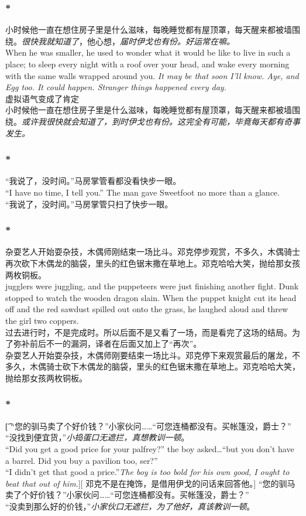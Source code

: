 \documentclass[12pt,a4paper]{article}
\newcommand{\h}[1]{{\color{red}#1}\\}
\newcommand{\la}[1]{{\color{blue}#1}\\}
\begin{document}
\subsubsection{\color{red}*}\la{
	小时候他一直在想住房子里是什么滋味，每晚睡觉都有屋顶罩，每天醒来都被墙围绕。\emph{很快我就知道了}，他心想，\emph{届时伊戈也有份。好运常在嘛。}\\
	When he was smaller, he used to wonder what it would be like to live in such a place; to sleep every night with a roof over your head, and wake every morning with the same walls wrapped around you. \emph{It may be that soon I'll know. Aye, and Egg too. It could happen. Stranger things happened every day.}}\h{
	虚拟语气变成了肯定}
	小时候他一直在想住房子里是什么滋味，每晚睡觉都有屋顶罩，每天醒来都被墙围绕。\emph{或许我很快就会知道了，到时伊戈也有份。这完全有可能，毕竟每天都有奇事发生。}
	
\subsubsection{\color{red}*}\la{	
	“我说了，没时间。”马房掌管看都没看快步一眼。\\
	“I have no time, I tell you.” The man gave Sweetfoot no more than a glance. }
	“我说了，没时间。”马房掌管只扫了快步一眼。
	
\subsubsection{\color{red}*}\la{
	杂耍艺人开始耍杂技，木偶师刚结束一场比斗。邓克停步观赏，不多久，木偶骑士再次砍下木偶龙的脑袋，里头的红色锯末撒在草地上。邓克哈哈大笑，抛给那女孩两枚铜板。 \\
	jugglers were juggling, and the puppeteers were just finishing another fight. Dunk stopped to watch the wooden dragon slain. When the puppet knight cut its head off and the red sawdust spilled out onto the grass, he laughed aloud and threw the girl two coppers. }\h{
	过去进行时，不是完成时。所以后面不是又看了一场，而是看完了这场的结局。为了弥补前后不一的漏洞，译者在后面又加上了“再次”。}
	杂耍艺人开始耍杂技，木偶师刚要结束一场比斗。邓克停下来观赏最后的屠龙，不多久，木偶骑士砍下木偶龙的脑袋，里头的红色锯末撒在草地上。邓克哈哈大笑，抛给那女孩两枚铜板。

\subsubsection{\color{red}*}\t[
	“您的驯马卖了个好价钱？”小家伙问……“可您连桶都没有。买帐篷没，爵士？”\\
	“没找到便宜货，”\emph{小捣蛋口无遮拦，真想教训一顿}。\\
	“Did you get a good price for your palfrey?” the boy asked\ldots “but you don't have a barrel. Did you buy a pavilion too, ser?”\\
	“I didn't get that good a price.”\emph{The boy is too bold for his own good, I ought to beat that out of him.}][
	邓克不是在掩饰，是借用伊戈的问话来回答他。]
	“您的驯马卖了个好价钱？”小家伙问……“可您连桶都没有。买帐篷没，爵士？”\\
	“没卖到那么好的价钱，”\emph{小家伙口无遮拦，为了他好，真该教训一顿}。	
	
\end{document}
